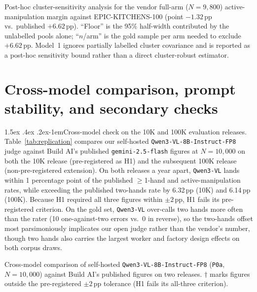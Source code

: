 \documentclass[11pt]{article}
\makeatletter
\renewcommand\paragraph{\@startsection{paragraph}{4}{\z@}%
  {1.5ex \@plus .4ex \@minus .2ex}{-1em}{\normalfont\normalsize\bfseries}}
\makeatother
\begin{document}
\begin{table}[t]
\centering\footnotesize

\caption{Post-hoc cluster-sensitivity analysis for the vendor full-arm ($N=9{,}800$)
active-manipulation margin against EPIC-KITCHENS-100 (point $-1.32$\,pp vs.\ published
$+6.62$\,pp). ``Floor'' is the 95\% half-width contributed by the unlabelled pools alone;
``$n$/arm'' is the gold sample per arm needed to exclude $+6.62$\,pp. Model~1 ignores partially
labelled cluster covariance \citep{broska2026crppi} and is reported as a post-hoc sensitivity
bound rather than a direct cluster-robust estimator.}
\label{tab:csens}
\end{table}

\section{Cross-model comparison, prompt stability, and secondary checks}
\label{sec:secondary}

\paragraph{Cross-model check on the 10K and 100K evaluation releases.}
Table~\ref{tab:replication} compares our self-hosted \texttt{Qwen3-VL-8B-Instruct-FP8} judge
against Build AI's published \texttt{gemini-2.5-flash} figures at $N = 10{,}000$ on both the 10K
release (pre-registered as H1) and the subsequent 100K release (non-pre-registered extension).
On both releases a year apart, \texttt{Qwen3-VL} lands within 1 percentage point of the published
$\geq$1-hand and active-manipulation rates, while exceeding the published two-hands rate by
6.32\,pp (10K) and 6.14\,pp (100K). Because H1 required all three figures within $\pm 2$\,pp, H1
fails its pre-registered criterion. On the gold set, \texttt{Qwen3-VL} over-calls two hands more
often than the rater (10 one-against-two errors vs.\ 0 in reverse), so the two-hands offset most
parsimoniously implicates our open judge rather than the vendor's number, though two hands also
carries the largest worker and factory design effects on both corpus draws.

\begin{table}[t]
\centering\footnotesize

\caption{Cross-model comparison of self-hosted \texttt{Qwen3-VL-8B-Instruct-FP8} (\texttt{P0a},
$N = 10{,}000$) against Build AI's published figures on two releases. $\dagger$ marks figures
outside the pre-registered $\pm 2$\,pp tolerance (H1 fails its all-three criterion).}
\label{tab:replication}
\end{table}
\end{document}
